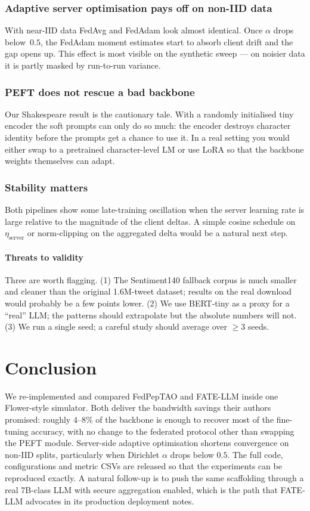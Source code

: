 \documentclass[journal]{IEEEtran}
\begin{document}
\subsubsection*{Adaptive server optimisation pays off on non-IID data}
With near-IID data FedAvg and FedAdam look almost identical. Once $\alpha$
drops below~$0.5$, the FedAdam moment estimates start to absorb client
drift and the gap opens up. This effect is most visible on the synthetic
sweep --- on noisier data it is partly masked by run-to-run variance.

\subsubsection*{PEFT does not rescue a bad backbone} Our Shakespeare
result is the cautionary tale. With a randomly initialised tiny encoder
the soft prompts can only do so much: the encoder destroys character
identity before the prompts get a chance to use it. In a real setting
you would either swap to a pretrained character-level LM or use LoRA so
that the backbone weights themselves can adapt.

\subsubsection*{Stability matters} Both pipelines show some late-training
oscillation when the server learning rate is large relative to the
magnitude of the client deltas. A simple cosine schedule on
$\eta_{\text{server}}$ or norm-clipping on the aggregated delta would be
a natural next step.

\paragraph{Threats to validity} Three are worth flagging. (1) The
Sentiment140 fallback corpus is much smaller and cleaner than the
original 1.6M-tweet dataset; results on the real download would
probably be a few points lower. (2) We use BERT-tiny as a proxy for a
``real'' LLM; the patterns should extrapolate but the absolute numbers
will not. (3) We run a single seed; a careful study should average over
$\geq 3$ seeds.


\section{Conclusion}
\label{sec:conclusion}
We re-implemented and compared FedPepTAO and FATE-LLM inside one Flower-style
simulator. Both deliver the bandwidth savings their authors promised:
roughly $4$--$8\%$ of the backbone is enough to recover most of the
fine-tuning accuracy, with no change to the federated protocol other than
swapping the PEFT module. Server-side adaptive optimisation shortens
convergence on non-IID splits, particularly when Dirichlet $\alpha$ drops
below $0.5$. The full code, configurations and metric CSVs are released so
that the experiments can be reproduced exactly. A natural follow-up is to
push the same scaffolding through a real 7B-class LLM with secure
aggregation enabled, which is the path that FATE-LLM advocates in its
production deployment notes.
\end{document}
